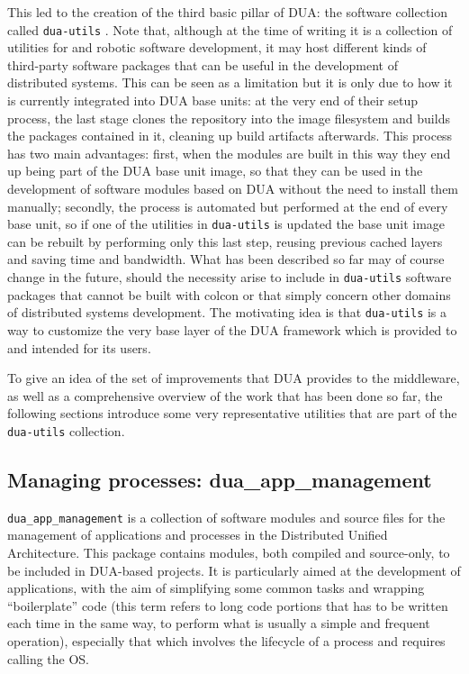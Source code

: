 This led to the creation of the third basic pillar of DUA: the software collection called \texttt{dua-utils} \cite{masocco_dua-utils_nodate}. Note that, although at the time of writing it is a collection of utilities for \ROS and robotic software development, it may host different kinds of third-party software packages that can be useful in the development of distributed systems. This can be seen as a limitation but it is only due to how it is currently integrated into DUA base units: at the very end of their setup process, the last stage clones the repository into the image filesystem and builds the packages contained in it, cleaning up build artifacts afterwards. This process has two main advantages: first, when the modules are built in this way they end up being part of the DUA base unit image, so that they can be used in the development of software modules based on DUA without the need to install them manually; secondly, the process is automated but performed at the end of every base unit, so if one of the utilities in \texttt{dua-utils} is updated the base unit image can be rebuilt by performing only this last step, reusing previous cached layers and saving time and bandwidth. What has been described so far may of course change in the future, should the necessity arise to include in \texttt{dua-utils} software packages that cannot be built with colcon or that simply concern other domains of distributed systems development. The motivating idea is that \texttt{dua-utils} is a way to customize the very base layer of the DUA framework which is provided to and intended for its users.

To give an idea of the set of improvements that DUA provides to the \ROS middleware, as well as a comprehensive overview of the work that has been done so far, the following sections introduce some very representative utilities that are part of the \texttt{dua-utils} collection.

\subsection{Managing \ROS processes: dua\_app\_management}
\label{sec:dua_app_management}
\texttt{dua\_app\_management} is a collection of software modules and source files for the management of applications and processes in the Distributed Unified Architecture. This package contains modules, both compiled and source-only, to be included in DUA-based projects. It is particularly aimed at the development of \ROS applications, with the aim of simplifying some common tasks and wrapping ``boilerplate'' code (this term refers to long code portions that has to be written each time in the same way, to perform what is usually a simple and frequent operation), especially that which involves the lifecycle of a process and requires calling the OS.

